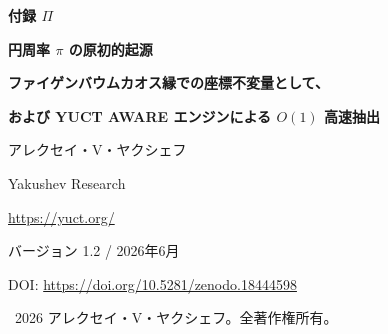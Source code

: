 \documentclass[12pt,a4paper]{article}
\newcommand{\Sodd}{S_{\mathrm{odd}}}
\newcommand{\Seven}{S_{\mathrm{even}}}
\newcommand{\df}{d_{\!f}}
\begin{document}
	
	\begin{titlepage}
		\centering
		\vspace*{0cm}
		
		{\Huge\bfseries 付録 $\Pi$\par}
		\vspace{0.5cm}
		{\Large\bfseries 円周率 $\pi$ の原初的起源\par}
		\vspace{0.3cm}
		{\Large\bfseries ファイゲンバウムカオス縁での座標不変量として、\par}
		\vspace{0.3cm}
		{\Large\bfseries および YUCT AWARE エンジンによる $O(1)$ 高速抽出\par}
		\vspace{1.0cm}
		
		{\large アレクセイ・V・ヤクシェフ\par}
		\vspace{0.3cm}
		{\normalsize Yakushev Research\par}
		{\normalsize \url{https://yuct.org/}\par}
		
		\vspace{0.5cm}
		{\normalsize バージョン 1.2 / 2026年6月\par}
		\vspace{0.3cm}
		{\normalsize DOI: \url{https://doi.org/10.5281/zenodo.18444598}\par}
		
		\vfill
		
		\begin{abstract}
			\noindent
			幾何定数 $\pi$ は伝統的に円周と直径の超越的な比と見なされてきた。ヤクシェフ統一調整理論（YUCT）の枠組みでは、$\pi$ は真空格子の剛体代数ループ（$\Sodd=6/5$, $\Seven=4/5$）とカオス onset におけるファイゲンバウム周期倍化カスケードの相互作用から生じる決定論的位相不変量であることを示す。関係式 $2\alpha^2 = \pi\delta$（$\alpha\approx2.5029$, $\delta\approx4.6692$ はファイゲンバウム定数）は、$\pi$ が三次元座標ネットワーク（$\df=3$）をカオス的崩壊から安定化する位相同期係数であることを明らかにする。代数的近似 $\pi \approx \Sodd\cdot\varphi^2$（$\varphi$ は黄金比）は基本乖離 $\Delta\pi \approx 4.8\times10^{-5}$ を与え、これは丸め誤差ではなく空間の離散量子化ステップである。波や渦現象における $\pi$ の遍在性は、素数分布を支配するのと同じ符号ゲート機構の直接的な結果である。
			
			我々は、静的・動的 $\pi$、微細構造定数、位相ゲート機構による $n$ 番目の素数候補、フラクタル臨界点、生物学的ねじれ比を同時に抽出する完全な非計算型ナビゲーションエンジン \texttt{yuct\_constants.py v4.0} を提示する。エンジンは $\sim 255\ \mu\text{s}$ で実行され、動的メモリをゼロバイト使用し、$O(1)$ 抽出パラダイムを完璧に示す。すべての値は反復なしで代数ループから直接得られ、自然の基本定数は計算されるのではなく、真空の剛体座標格子から \emph{読み取られる} ことを示している。
		\end{abstract}
		
		\vspace{0.5cm}
		\textcopyright\ 2026 アレクセイ・V・ヤクシェフ。全著作権所有。
	\end{titlepage}
	
\end{document}
